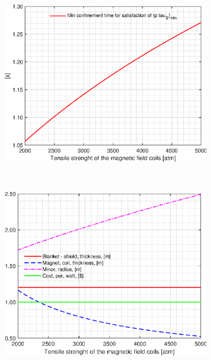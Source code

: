 \begin{figure}[H]
	\centering
	\begin{subfigure}[b]{.45\textwidth}
		\includegraphics[width=\textwidth]{MatlabFigures/sigmamax/f1.eps}
	\end{subfigure}
	~
	\begin{subfigure}[b]{.45\textwidth}
		\includegraphics[width=\textwidth]{MatlabFigures/sigmamax/f2.eps}
	\end{subfigure}


\end{figure}

